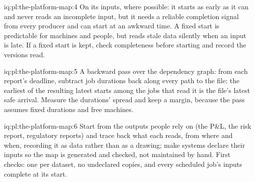 \begin{solution}{iq:pl:the-platform-map:4}
On its inputs, where possible: it starts as early as it can and never reads an incomplete input, but it needs a reliable
completion signal from every producer and can start at an awkward time. A fixed start is predictable for machines and people,
but reads stale data silently when an input is late. If a fixed start is kept, check completeness before starting and record
the versions read.
\end{solution}

\begin{solution}{iq:pl:the-platform-map:5}
A backward pass over the dependency graph: from each report's deadline, subtract job durations back along every path to the
file; the earliest of the resulting latest starts among the jobs that read it is the file's latest safe arrival. Measure the
durations' spread and keep a margin, because the pass assumes fixed durations and free machines.
\end{solution}

\begin{solution}{iq:pl:the-platform-map:6}
Start from the outputs people rely on (the P\&L, the risk report, regulatory reports) and trace back what each reads, from
where and when, recording it as data rather than as a drawing; make systems declare their inputs so the map is generated and
checked, not maintained by hand. First checks: one  per dataset, no undeclared copies, and every scheduled job's
inputs complete at its start.
\end{solution}

